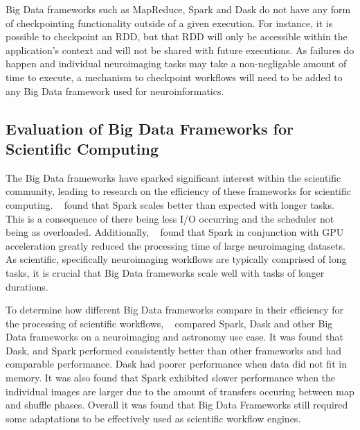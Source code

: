             Big Data frameworks such as MapReduce, Spark and Dask do not have   
            any form of checkpointing functionality outside of a given          
            execution. For instance, it is possible to checkpoint an RDD, but   
            that RDD will only be accessible within the application's context   
            and will not be shared with future executions. As failures do       
            happen and individual neuroimaging tasks may take a non-negligable  
            amount of time to execute, a mechanism to checkpoint workflows      
            will need to be added to any Big Data framework used for             
            neuroinformatics.                                                   

                                                                                
        \subsection{Evaluation of Big Data Frameworks for Scientific Computing}\label{eval}     
            The Big Data frameworks have sparked significant interest within the 
            scientific community, leading to research on the efficiency of      
            these frameworks for scientific computing. ~\cite{souza2017spark} found  
            that Spark scales better than expected with longer tasks. This is   
            a consequence of there being less I/O occurring and the scheduler 
            not being as overloaded. 
            Additionally, ~\cite{boubela2016big} found that Spark in conjunction with  
            GPU acceleration greatly reduced the processing time of large       
            neuroimaging datasets.                                              
            As scientific, specifically neuroimaging workflows are typically    
            comprised of long tasks, it                                         
            is crucial that Big Data frameworks scale well with tasks of longer  
            durations.
    
            To determine how different Big Data frameworks compare in their 
            efficiency for the processing of scientific workflows, 
            ~\cite{mehta2017comparative} compared Spark, Dask and other Big Data 
            frameworks on
            a neuroimaging and astronomy use case. It was found that Dask, 
            and Spark performed consistently better than other frameworks and 
            had comparable 
            performance. Dask had poorer performance when data did not fit in
            memory. It was also found that Spark exhibited slower performance 
            when the individual images are larger due to the amount of transfers
            occuring between map and shuffle phases. Overall it was
            found that Big Data Frameworks still required some adaptations to be
            effectively used as scientific workflow engines.            
            
